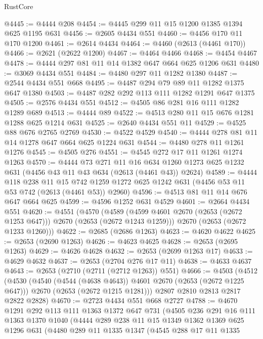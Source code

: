 \begin{lexlean}{RustCore}
\begin{coremodule}
@4445 := @4444 @208
@4454 := @4445 @299 @11 @15 @1200 @1385 @1394 @625 @1195 @631
@4456 := @2605 @4434 @551
@4460 := @4456 @170 @11 @170 @1200
@4461 := @2614 @4434
@4464 := @4460 (@2613 (@4461 @170))
@4466 := @2621 (@2622 @1200)
@4467 := @4464 @4466
@4468 := @4454 @4467
@4478 := @4444 @297 @81 @11 @14 @1382 @647 @664 @625 @1206 @631
@4480 := @3069 @4434 @551
@4484 := @4480 @297 @11 @1282 @1380
@4487 := @2544 @4434 @551 @668
@4495 := @4487 @294 @79 @89 @11 @1282 @1375 @647 @1380
@4503 := @4487 @282 @292 @113 @111 @1282 @1291 @647 @1375
@4505 := @2576 @4434 @551
@4512 := @4505 @86 @281 @16 @111 @1282 @1289 @689
@4513 := @4444 @89
@4522 := @4513 @280 @11 @15 @676 @1281 @1288 @625 @1214 @631
@4525 := @2640 @4434 @551 @11
@4529 := @4525 @88 @676 @2765 @2769
@4530 := @4522 @4529
@4540 := @4444 @278 @81 @11 @14 @1278 @647 @664 @625 @1224 @631
@4544 := @4480 @278 @11 @1261 @1276
@4545 := @4505 @276
@4551 := @4545 @272 @17 @11 @1261 @1274 @1263
@4570 := @4444
    @73
    @271
    @11
    @16
    @634
    @1260
    @1273
    @625
    @1232
    @631
    (@4456 @43 @11 @43 @634 (@2613 (@4461 @43)) @2624)
@4589 := @4444
    @118
    @238
    @11
    @15
    @742
    @1259
    @1272
    @625
    @1242
    @631
    (@4456 @53 @11 @53 @742 (@2613 (@4461 @53)) @2960)
@4596 := @4513 @81 @11 @14 @676 @647 @664 @625
@4599 := @4596 @1252 @631 @4529
@4601 := @2664 @4434 @551
@4620 := @4551
    (@4570
      (@4589 (@4599 @4601 @2670 (@2653 (@2672 @1253 @647))) @2670 (@2653 (@2672 @1243 @1259)))
      @2670
      (@2653 (@2672 @1233 @1260)))
@4622 := @2685 (@2686 @1263)
@4623 := @4620 @4622
@4625 := @2653 (@2690 @1263)
@4626 := @4623 @4625
@4628 := @2653 (@2695 @1263)
@4629 := @4626 @4628
@4632 := @2653 (@2699 @1263 @17)
@4633 := @4629 @4632
@4637 := @2653 (@2704 @276 @17 @11)
@4638 := @4633 @4637
@4643 := @2653 (@2710 (@2711 (@2712 @1263)) @551)
@4666 := @4503
    (@4512
      (@4530
        (@4540 (@4544 (@4638 @4643)) @4601 @2670 (@2653 (@2672 @1225 @647)))
        @2670
        (@2653 (@2672 @1215 @1281)))
      @2807
      @2810
      @2813
      @2817
      @2822
      @2828)
@4670 := @2723 @4434 @551 @668 @2727
@4788 := @4670
    @1291
    @292
    @113
    @111
    @1363
    @1372
    @647
    @731
    (@4505
      @236
      @291
      @16
      @111
      @1363
      @1370
      @1040
      (@4444
        @289
        @238
        @11
        @15
        @1349
        @1362
        @1369
        @625
        @1296
        @631
        (@4480
          @289
          @11
          @1335
          @1347
          (@4545
            @288
            @17
            @11
            @1335

\end{coremodule}
\end{lexlean}
